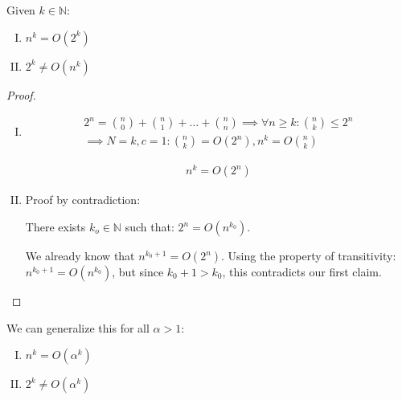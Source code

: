 \documentclass[00_complete]{subfiles}
\begin{document}
\begin{claim}
    Given $k \in \mathbb{N}$:
\begin{enumerate}[I.]
    \item $n^k=O(2^k)$
    \item $2^k \neq O(n^k)$
\end{enumerate}
\begin{proof}
    \begin{enumerate}[I.]
    \item \begin{gather*}
        2^n = \binom{n}{0} + \binom{n}{1} + \dots + \binom{n}{n} \implies
        \forall n \geq k: \binom{n}{k}\leq 2^n \\
        \implies N=k, c=1: \binom{n}{k}=O(2^n), n^k=O\binom{n}{k}
    \end{gather*}
    \begin{conclusion}
        \begin{gather*}
            n^k=O(2^n) \tag{\checkmark}
        \end{gather*}
    \end{conclusion}
    \item Proof by contradiction:

    There exists $k_o \in \mathbb{N}$ such that: $2^n = O(n^{k_0})$.

    We already know that $n^{k_0+1}=O(2^n)$. Using the property of
    transitivity: $n^{k_0+1}=O(n^{k_0})$, but since $k_0+1>k_0$, this
    contradicts our first claim.
    \end{enumerate}
\end{proof}
\begin{note}
    We can generalize this for all $\alpha>1$:
\begin{enumerate}[I.]
    \item $n^k=O(\alpha^k)$
    \item $2^k \neq O(\alpha^k)$
\end{enumerate}
\end{note}
\end{claim}
\end{document}
